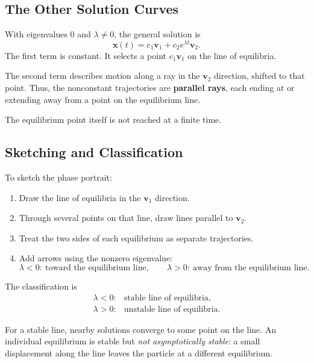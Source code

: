 \documentclass[10pt,letterpaper]{article}
\begin{document}
\subsection{The Other Solution Curves}

With eigenvalues $0$ and $\lambda\ne0$, the general
solution is
\[
\boxed{
\mathbf{x}(t)
=c_1\mathbf{v}_1+c_2e^{\lambda t}\mathbf{v}_2.
}
\]
The first term is constant. It selects a point
$c_1\mathbf{v}_1$ on the line of equilibria.

The second term describes motion along a ray in
the $\mathbf{v}_2$ direction, shifted to that point.
Thus, the nonconstant trajectories are
\textbf{parallel rays}, each ending at or extending
away from a point on the equilibrium line.

The equilibrium point itself is not reached at
a finite time.

\subsection{Sketching and Classification}

To sketch the phase portrait:
\begin{enumerate}
    \item Draw the line of equilibria in the
    $\mathbf{v}_1$ direction.
    \item Through several points on that line,
    draw lines parallel to $\mathbf{v}_2$.
    \item Treat the two sides of each equilibrium
    as separate trajectories.
    \item Add arrows using the nonzero eigenvalue:
    \[
    \lambda<0:\ \text{toward the equilibrium line},
    \qquad
    \lambda>0:\ \text{away from the equilibrium line}.
    \]
\end{enumerate}

The classification is
\[
\boxed{
\begin{array}{ll}
\lambda<0: & \text{stable line of equilibria},\\
\lambda>0: & \text{unstable line of equilibria}.
\end{array}
}
\]

For a stable line, nearby solutions converge to
some point on the line. An individual equilibrium
is stable but \textit{not asymptotically stable}:
a small displacement along the line leaves the
particle at a different equilibrium.
\end{document}
